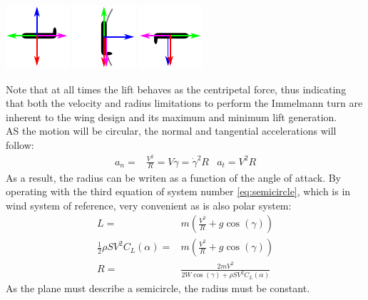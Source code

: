 	\includegraphics[width=0.3\linewidth]{figures/free-body-1.pdf} \hfill
	\label{fig:free-body-1}
		\includegraphics[width=0.3\linewidth]{figures/free-body-2.pdf}\hfill
	\label{fig:free-body-2}
		\includegraphics[width=0.3\linewidth]{figures/free-body-3.pdf}
	\label{fig:free-body-3}
	\vspace{0.5cm}

Note that at all times the lift behaves as the centripetal force, thus indicating that both the velocity and radius limitations to perform the Immelmann turn are inherent to the wing design and its maximum and minimum lift generation.\\
AS the motion will be circular, the normal and tangential accelerations will follow:
\begin{align*}
	a_n=&\frac{V^2}{R}=V\dot{\gamma}=\dot{\gamma}^2R&a_t=V^2R
\end{align*}
As a result, the radius can be writen as a function of the angle of attack. By operating with the third equation of system number \ref{eq:semicircle}, which is in wind system of reference, very convenient as is also polar system:
\begin{align*}
	L=&m\left(\frac{V^2}{R}+g\cos(\gamma)\right)\\
	\frac{1}{2}\rho S V^2 C_L(\alpha)=&m\left(\frac{V^2}{R}+g\cos(\gamma)\right)\\
	R=&\frac{2mV^2}{2W\cos(\gamma)+\rho S V^2 C_L(\alpha)}
\end{align*}
As the plane must describe a semicircle, the radius must be constant.

